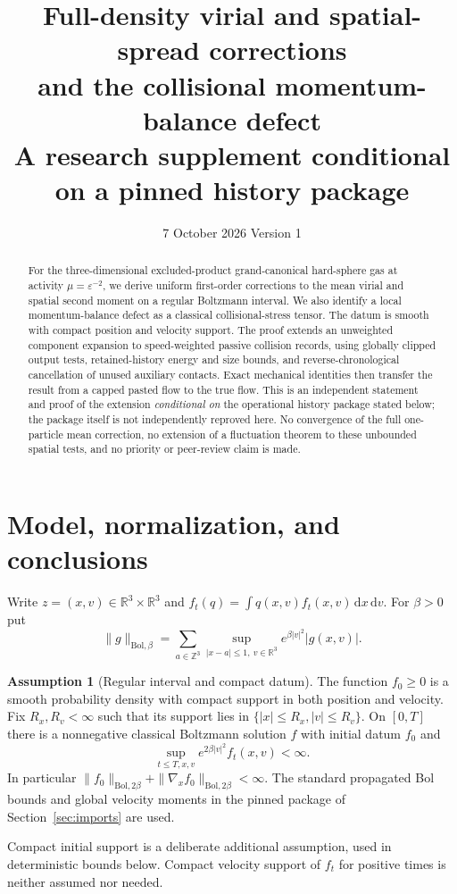 \documentclass[11pt,letterpaper]{article}
\title{Full-density virial and spatial-spread corrections\\and the collisional momentum-balance defect\\[0.5em]\large A research supplement conditional on a pinned history package}
\author{}
\date{7 October 2026 \quad Version 1}
\numberwithin{equation}{section}
\theoremstyle{definition}\newtheorem{assumption}[theorem]{Assumption}
\theoremstyle{remark}\newtheorem{remark}[theorem]{Remark}
\newcommand{\R}{\mathbb R}\newcommand{\E}{\mathbb E}\newcommand{\Prob}{\mathbb P}
\newcommand{\eps}{\varepsilon}\newcommand{\dd}{\,\mathrm d}
\begin{document}
\maketitle
\begin{abstract}
For the three-dimensional excluded-product grand-canonical hard-sphere gas at activity $\mu=\eps^{-2}$, we derive uniform first-order corrections to the mean virial and spatial second moment on a regular Boltzmann interval. We also identify a local momentum-balance defect as a classical collisional-stress tensor. The datum is smooth with compact position and velocity support. The proof extends an unweighted component expansion to speed-weighted passive collision records, using globally clipped output tests, retained-history energy and size bounds, and reverse-chronological cancellation of unused auxiliary contacts. Exact mechanical identities then transfer the result from a capped pasted flow to the true flow. This is an independent statement and proof of the extension \emph{conditional on} the operational history package stated below; the package itself is not independently reproved here. No convergence of the full one-particle mean correction, no extension of a fluctuation theorem to these unbounded spatial tests, and no priority or peer-review claim is made.
\end{abstract}
\tableofcontents

\section{Model, normalization, and conclusions}\label{sec:statement}
Write $z=(x,v)\in\R^3\times\R^3$ and $f_t(q)=\int q(x,v)f_t(x,v)\dd x\dd v$. For $\beta>0$ put
\[
 \|g\|_{\mathrm{Bol},\beta}
 =\sum_{a\in\mathbb Z^3}\sup_{|x-a|\le1,\ v\in\R^3}
                   e^{\beta|v|^2}|g(x,v)|.
\]
\begin{assumption}[Regular interval and compact datum]\label{ass:model}
The function $f_0\ge0$ is a smooth probability density with compact support in both position and velocity. Fix $R_x,R_v<\infty$ such that its support lies in $\{|x|\le R_x,|v|\le R_v\}$. On $[0,T]$ there is a nonnegative classical Boltzmann solution $f$ with initial datum $f_0$ and
\[
 \sup_{t\le T,x,v} e^{2\beta|v|^2}f_t(x,v)<\infty.
\]
In particular $\|f_0\|_{\mathrm{Bol},2\beta}+\|\nabla_x f_0\|_{\mathrm{Bol},2\beta}<\infty$. The standard propagated Bol bounds and global velocity moments in the pinned package of Section~\ref{sec:imports} are used.
\end{assumption}
Compact initial support is a deliberate additional assumption, used in deterministic bounds below. Compact velocity support of $f_t$ for positive times is neither assumed nor needed.
\end{document}
